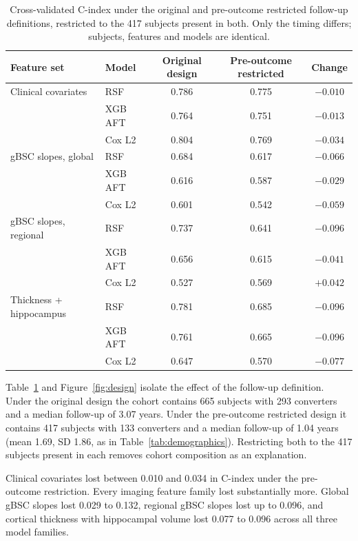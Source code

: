 \documentclass[blue]{ludusofficial}  %
\begin{document}
\begin{table}[t!]
\centering
\caption{Cross-validated C-index under the original and pre-outcome restricted follow-up definitions, restricted to the 417 subjects present in both. Only the timing differs; subjects, features and models are identical.}
\label{tab:design}
\begin{tabular}{llccc}
\hline
\textbf{Feature set} & \textbf{Model} & \textbf{Original design} & \textbf{Pre-outcome restricted} & \textbf{Change} \\
\hline
Clinical covariates & RSF & 0.786 & 0.775 & $-0.010$ \\
 & XGB AFT & 0.764 & 0.751 & $-0.013$ \\
 & Cox L2 & 0.804 & 0.769 & $-0.034$ \\
\hline
gBSC slopes, global & RSF & 0.684 & 0.617 & $-0.066$ \\
 & XGB AFT & 0.616 & 0.587 & $-0.029$ \\
 & Cox L2 & 0.601 & 0.542 & $-0.059$ \\
\hline
gBSC slopes, regional & RSF & 0.737 & 0.641 & $-0.096$ \\
 & XGB AFT & 0.656 & 0.615 & $-0.041$ \\
 & Cox L2 & 0.527 & 0.569 & $+0.042$ \\
\hline
Thickness + hippocampus & RSF & 0.781 & 0.685 & $-0.096$ \\
 & XGB AFT & 0.761 & 0.665 & $-0.096$ \\
 & Cox L2 & 0.647 & 0.570 & $-0.077$ \\
\hline
\end{tabular}
\end{table}

Table~\ref{tab:design} and Figure~\ref{fig:design} isolate the effect of the follow-up definition. Under the original design the cohort contains 665 subjects with 293 converters and a median follow-up of 3.07 years. Under the pre-outcome restricted design it contains 417 subjects with 133 converters and a median follow-up of 1.04 years (mean 1.69, SD 1.86, as in Table~\ref{tab:demographics}). Restricting both to the 417 subjects present in each removes cohort composition as an explanation.

Clinical covariates lost between 0.010 and 0.034 in C-index under the pre-outcome restriction. Every imaging feature family lost substantially more. Global gBSC slopes lost 0.029 to 0.132, regional gBSC slopes lost up to 0.096, and cortical thickness with hippocampal volume lost 0.077 to 0.096 across all three model families.
\end{document}
